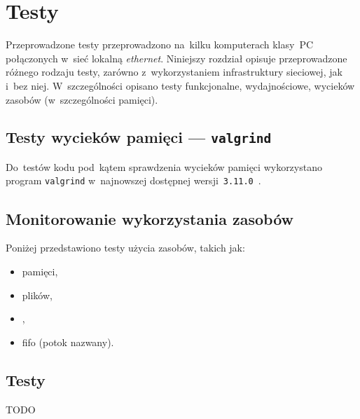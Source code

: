\documentclass[thesis]{subfiles}
\begin{document}
\chapter{Testy}
\label{chapter:testy}

Przeprowadzone testy przeprowadzono na~kilku komputerach klasy~PC połączonych w~sieć lokalną \emph{ethernet}. Niniejszy rozdział opisuje przeprowadzone różnego rodzaju testy, zarówno z~wykorzystaniem infrastruktury sieciowej, jak i~bez niej. W~szczególności opisano testy funkcjonalne, wydajnościowe, wycieków zasobów (w~szczególności pamięci).


\section{Testy wycieków pamięci --- \texttt{valgrind}}

Do~testów kodu pod~kątem sprawdzenia wycieków pamięci wykorzystano program \texttt{valgrind} w~najnowszej dostępnej wersji~\texttt{3.11.0}~\cite{valgrind}.


\section{Monitorowanie wykorzystania zasobów}

\noindent Poniżej przedstawiono testy użycia zasobów, takich jak:
\begin{itemize}
	\item pamięci,
	\item plików,
	\item {},
	\item \gls{fifo} (potok nazwany).
\end{itemize}


\section{Testy}

TODO
\end{document}
